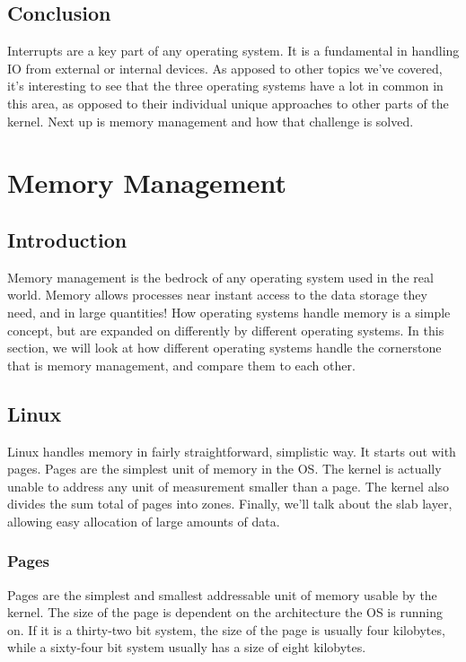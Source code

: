 \documentclass[10pt,letterpaper,onecolumn,draftclsnofoot]{IEEEtran}
\begin{document}
\subsection{Conclusion}

Interrupts are a key part of any operating system. It is a fundamental in handling IO from external or internal devices. As apposed to other topics we've covered, it's
interesting to see that the three operating systems have a lot in common in this
area, as opposed to their individual unique approaches to other parts of the
kernel. Next up is memory management and how that challenge is solved.

\section{Memory Management}
\subsection{Introduction}
Memory management is the bedrock of any operating system used in the real
world. Memory allows processes near instant access to the data storage they
need, and in large quantities! How operating systems handle memory is a simple
concept, but are expanded on differently by different operating systems. In
this section, we will look at how different operating systems handle the
cornerstone that is memory management, and compare them to each other.

\subsection{Linux}
Linux handles memory in fairly straightforward, simplistic way. It
starts out with pages. Pages are the simplest unit of memory in the OS.
The kernel is actually unable to address any unit of measurement smaller
than a page. The kernel also divides the sum total of pages into zones.
Finally, we'll talk about the slab layer, allowing easy allocation of
large amounts of data.
\subsubsection{Pages}
Pages are the simplest and smallest addressable unit of memory usable
by the kernel. The size of the page is dependent on the architecture
the OS is running on. If it is a thirty-two bit system, the size of the
page is usually four kilobytes, while a sixty-four bit system usually
has a size of eight kilobytes. \cite{robertlove2010}
\end{document}
